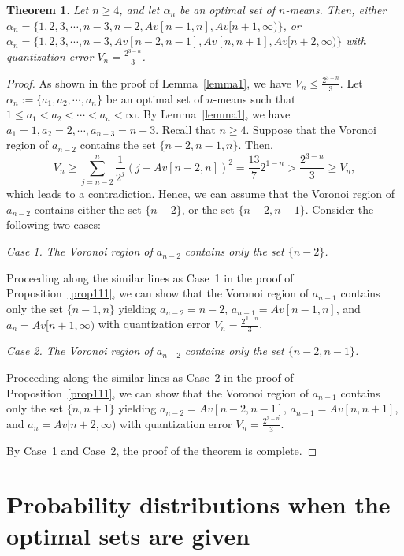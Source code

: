 \documentclass[12pt, reqno]{amsart}
\theoremstyle{plain}
\newtheorem{theorem}[subsection]{Theorem}
\theoremstyle{definition}
\newcommand{\set}[1]{\{#1\}}%
\newcommand{\ga}{\alpha}
\newcommand{\tit}{\textit}%
\begin{document}
\begin{theorem}
Let $n\geq 4$, and let $\ga_n$ be an optimal set of $n$-means. Then, either $\ga_n=\set{1,2,3, \cdots, n-3, n-2, Av[n-1, n], Av[n+1, \infty)}$, or $\ga_n=\set{1,2,3, \cdots, n-3, Av[n-2, n-1], Av[n, n+1], Av[n+2, \infty)}$ with quantization error $V_n=\frac{2^{3-n}}{3}$.
\end{theorem}
\begin{proof}
As shown in the proof of Lemma~\ref{lemma1}, we have $V_n\leq \frac{2^{3-n}}{3}$. Let $\ga_n:=\set{a_1, a_2, \cdots, a_n}$ be an optimal set of $n$-means such that $1\leq a_1<a_2<\cdots<a_n<\infty$. By Lemma~\ref{lemma1}, we have $a_1=1, a_2=2, \cdots, a_{n-3}=n-3$. Recall that $n\geq 4$. Suppose that the Voronoi region of $a_{n-2}$ contains the set $\set{n-2, n-1, n}$.
Then,
\[V_n\geq \sum_{j=n-2}^{n} \frac 1 {2^j}(j-Av[n-2, n])^2 =\frac{13}{7} 2^{1-n}>\frac{2^{3-n}}{3}\geq V_n,\]
which leads to a contradiction. Hence, we can assume that the Voronoi region of $a_{n-2}$ contains either the set $\set{n-2}$, or the set $\set{n-2, n-1}$. Consider the following two cases:

\tit{Case 1. The Voronoi region of $a_{n-2}$ contains only the set $\set{n-2}$.}

 Proceeding along the similar lines as Case~1 in the proof of Proposition~\ref{prop111}, we can show that the Voronoi region of $a_{n-1}$ contains only the set $\set{n-1, n}$ yielding $a_{n-2}=n-2$, $a_{n-1}=Av[n-1, n]$, and $a_n=Av[n+1, \infty)$ with quantization error $V_n=\frac{2^{3-n}}{3}$.

\tit{Case 2. The Voronoi region of $a_{n-2}$ contains only the set $\set{n-2, n-1}$.}

 Proceeding along the similar lines as Case~2 in the proof of Proposition~\ref{prop111}, we can show that the Voronoi region of $a_{n-1}$ contains only the set $\set{n, n+1}$ yielding $a_{n-2}=Av[n-2, n-1]$, $a_{n-1}=Av[n, n+1]$, and $a_n=Av[n+2, \infty)$ with quantization error $V_n=\frac{2^{3-n}}{3}$.

By Case~1 and Case~2, the proof of the theorem is complete.
\end{proof}


\section{Probability distributions when the optimal sets are given} \label{sec3}
\end{document}
